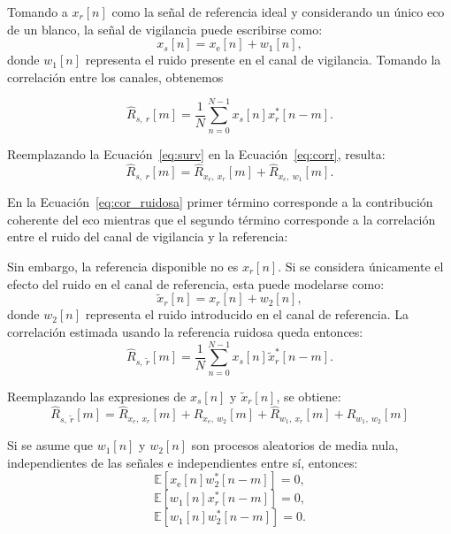 	Tomando a $x_r[n]$  como la señal de referencia ideal y considerando un único eco de un blanco, la señal de vigilancia puede escribirse como:
	\begin{equation}
		\label{eq:surv}
	x_s[n]
	=
	x_{\text{e}}[n] + w_1[n],
	\end{equation}
	donde $w_1[n]$ representa el ruido presente en el canal de vigilancia.
	Tomando la correlación entre los canales, obtenemos 

	
	\begin{equation}
		\label{eq:corr}
	\hat{R}_{s,\ r}[m]
	=
	\frac{1}{N}
	\sum_{n=0}^{N-1}
	x_s[n]x_r^*[n-m].
	\end{equation}

	Reemplazando la Ecuación~\ref{eq:surv} en la Ecuación~\ref{eq:corr}, resulta:
	\begin{equation}
		\label{eq:cor_ruidosa}
		\hat{R}_{s,\ r}[m] = \hat{R}_{x_e,\ x_r}[m] + \hat{R}_{x_e,\ w_1}[m]. 
	\end{equation}
	

	

	En la Ecuación~\ref{eq:cor_ruidosa} primer término corresponde a la contribución coherente del eco mientras que el segundo término corresponde a la correlación entre el ruido del canal de vigilancia y la referencia:
	

	Sin embargo, la referencia disponible no es $x_r[n]$. Si se considera únicamente el efecto del ruido en el canal de referencia, esta puede modelarse como:
	\begin{equation}
	\tilde{x}_r[n]
	=
	x_r[n]+w_2[n],
	\end{equation}
	donde $w_2[n]$ representa el ruido introducido en el canal de referencia. La correlación estimada usando la referencia ruidosa queda entonces:
	\begin{equation}
	\hat{R}_{s,\ \tilde{r}}[m]
	=
	\frac{1}{N}
	\sum_{n=0}^{N-1}
	x_s[n]\tilde{x}_r^*[n-m].
	\end{equation}

	Reemplazando las expresiones de $x_s[n]$ y $\tilde{x}_r[n]$, se obtiene:
	\begin{equation}
	\hat{R}_{s,\ \tilde{r}}[m] = \hat{R}_{x_e,\ x_r}[m] + \hat{R}_{x_e,\ w_2}[m] + \hat{R}_{w_1,\ x_r}[m] + \hat{R}_{w_1,\ w_2}[m]
	\end{equation}


	Si se asume que $w_1[n]$ y $w_2[n]$ son procesos aleatorios de media nula, independientes de las señales e independientes entre sí, entonces:
	\begin{equation}
		\mathbb{E}\left[
		x_{\text{e}}[n]w_2^*[n-m]
		\right]
		=
		0,
	\end{equation}
	\begin{equation}
		\mathbb{E}\left[
		w_1[n]x_r^*[n-m]
		\right]
		=
		0,
	\end{equation}
	\begin{equation}
		\mathbb{E}\left[
		w_1[n]w_2^*[n-m]
		\right]
		=
		0.
	\end{equation}

